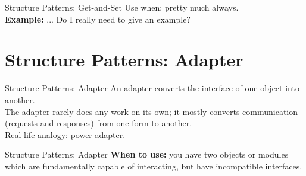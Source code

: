 \documentclass[14pt,aspectratio=169]{beamer}
\begin{document}
\begin{frame}{Structure Patterns: Get-and-Set}
Use when: pretty much always.\\
\vspace{1em}
\textbf{Example:} ... Do I really need to give an example?
\end{frame}



\section*{Structure Patterns: Adapter}



\begin{frame}{Structure Patterns: Adapter}
An adapter converts the interface of one object into another.\\
\vspace{1em}
The adapter rarely does any work on its own; it mostly converts communication (requests and responses) from one form to another.\\
\vspace{1em}
Real life analogy: power adapter.
\end{frame}



\begin{frame}{Structure Patterns: Adapter}
\large
\textbf{When to use:} you have two objects or modules which are fundamentally capable of interacting, but have incompatible interfaces.
\end{frame}
\end{document}
